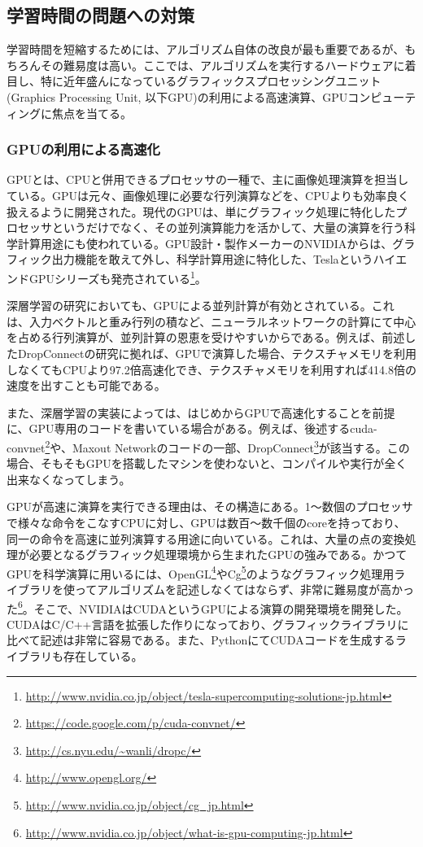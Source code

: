 \subsection{学習時間の問題への対策}
学習時間を短縮するためには、アルゴリズム自体の改良が最も重要であるが、もちろんその難易度は高い。ここでは、アルゴリズムを実行するハードウェアに着目し、特に近年盛んになっているグラフィックスプロセッシングユニット(Graphics Processing Unit, 以下GPU)の利用による高速演算、GPUコンピューティングに焦点を当てる。
\subsubsection{GPUの利用による高速化}
GPUとは、CPUと併用できるプロセッサの一種で、主に画像処理演算を担当している。GPUは元々、画像処理に必要な行列演算などを、CPUよりも効率良く扱えるように開発された。現代のGPUは、単にグラフィック処理に特化したプロセッサというだけでなく、その並列演算能力を活かして、大量の演算を行う科学計算用途にも使われている。GPU設計・製作メーカーのNVIDIAからは、グラフィック出力機能を敢えて外し、科学計算用途に特化した、TeslaというハイエンドGPUシリーズも発売されている\footnote{\url{http://www.nvidia.co.jp/object/tesla-supercomputing-solutions-jp.html}}。\par 
深層学習の研究においても、GPUによる並列計算が有効とされている。これは、入力ベクトルと重み行列の積など、ニューラルネットワークの計算にて中心を占める行列演算が、並列計算の恩恵を受けやすいからである\cite{bengio2012practical}。例えば、前述したDropConnectの研究\cite{wan2013regularization}に拠れば、GPUで演算した場合、テクスチャメモリを利用しなくてもCPUより97.2倍高速化でき、テクスチャメモリを利用すれば414.8倍の速度を出すことも可能である。\par
また、深層学習の実装によっては、はじめからGPUで高速化することを前提に、GPU専用のコードを書いている場合がある。例えば、後述するcuda-convnet\footnote{\url{https://code.google.com/p/cuda-convnet/}}や、Maxout Network\cite{goodfellow2013maxout}のコードの一部、DropConnect\cite{wan2013regularization}\footnote{\url{http://cs.nyu.edu/~wanli/dropc/}}が該当する。この場合、そもそもGPUを搭載したマシンを使わないと、コンパイルや実行が全く出来なくなってしまう。\par
GPUが高速に演算を実行できる理由は、その構造にある。1〜数個のプロセッサで様々な命令をこなすCPUに対し、GPUは数百〜数千個のcoreを持っており、同一の命令を高速に並列演算する用途に向いている。これは、大量の点の変換処理が必要となるグラフィック処理環境から生まれたGPUの強みである。かつてGPUを科学演算に用いるには、OpenGL\footnote{\url{http://www.opengl.org/}}やCg\footnote{\url{http://www.nvidia.co.jp/object/cg_jp.html}}のようなグラフィック処理用ライブラリを使ってアルゴリズムを記述しなくてはならず、非常に難易度が高かった\footnote{\url{http://www.nvidia.co.jp/object/what-is-gpu-computing-jp.html}}。そこで、NVIDIAはCUDAというGPUによる演算の開発環境を開発した\cite{garland2008parallel}。CUDAはC/C++言語を拡張した作りになっており、グラフィックライブラリに比べて記述は非常に容易である。また、PythonにてCUDAコードを生成するライブラリも存在している\cite{kloeckner2009pycuda:}\cite{klockner2012pycuda}。\par
